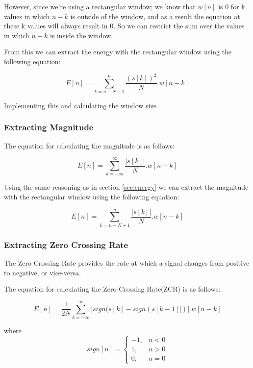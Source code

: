 \documentclass[a4paper]{article}
\begin{document}
However, since we're using a rectangular window; we know that $w[n]$ is 0 for k values in which $n - k$
is outside of the window, and as a result the equation at these k values will always result in 0. 
So we can restrict the sum over the values in which $n - k$ is inside the window.

From this we can extract the energy with the rectangular window using the following
equation:

\begin{equation}
 E[n] = \sum_{k=n-N+1}^{n}\frac{(s[k])^2}{N}.w[n-k]
\end{equation}


Implementing this and calculating the window size



\subsubsection{Extracting Magnitude}

The equation for calculating the magnitude is as follows:

\begin{equation}
 E[n] = \sum_{k=-\infty}^{\infty}\frac{|s[k]|}{N}.w[n-k]
\end{equation}

Using the same reasoning as in section \ref{sec:energy} we can extract the
magnitude with the rectangular window using the following equation:

\begin{equation}
 E[n] = \sum_{k=n-N+1}^{n}\frac{|s[k]|}{N}.w[n-k]
\end{equation}



\subsubsection{Extracting Zero Crossing Rate}

The Zero Crossing Rate provides the rate at which a signal changes from
positive to negative, or vice-versa.

The equation for calculating the Zero-Crossing Rate(ZCR) is as follows:

\begin{equation}
 E[n] = \frac{1}{2N}\sum_{k=-\infty}^{\infty}|sign(s[k] - sign(s[k-1]])|.w[n-k]
\end{equation}

where
\begin{equation}
sign[n] =
    \begin{cases}
        -1, & n  < 0\\
         1, & n  > 0\\
         0, & n  = 0
    \end{cases}
\end{equation}
\end{document}

